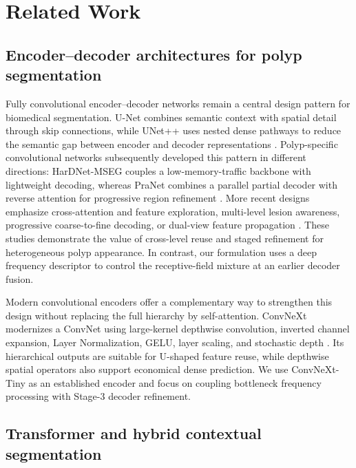 \section{Related Work}\label{related-work}

\subsection{Encoder--decoder architectures for polyp segmentation}

Fully convolutional encoder--decoder networks remain a central design pattern for
biomedical segmentation. U-Net combines semantic context with spatial detail through
skip connections, while UNet++ uses nested dense pathways to reduce the semantic gap
between encoder and decoder representations \cite{unet,unetpp}. Polyp-specific
convolutional networks subsequently developed this pattern in different directions:
HarDNet-MSEG couples a low-memory-traffic backbone with lightweight decoding, whereas
PraNet combines a parallel partial decoder with reverse attention for progressive
region refinement \cite{hardnetmseg,pranet}. More recent designs emphasize
cross-attention and feature exploration, multi-level lesion awareness, progressive
coarse-to-fine decoding, or dual-view feature propagation
\cite{cafenet,mlbnet,mspn,dvfipnet}. These studies demonstrate the value of cross-level
reuse and staged refinement for heterogeneous polyp appearance. In contrast, our
formulation uses a deep frequency descriptor to control the receptive-field mixture at
an earlier decoder fusion.

Modern convolutional encoders offer a complementary way to strengthen this design
without replacing the full hierarchy by self-attention. ConvNeXt modernizes a ConvNet
using large-kernel depthwise convolution, inverted channel expansion, Layer
Normalization, GELU, layer scaling, and stochastic depth \cite{convnext}. Its
hierarchical outputs are suitable for U-shaped feature reuse, while depthwise spatial
operators also support economical dense prediction. We use ConvNeXt-Tiny as an
established encoder and focus on coupling bottleneck frequency processing with
Stage-3 decoder refinement.

\subsection{Transformer and hybrid contextual segmentation}

